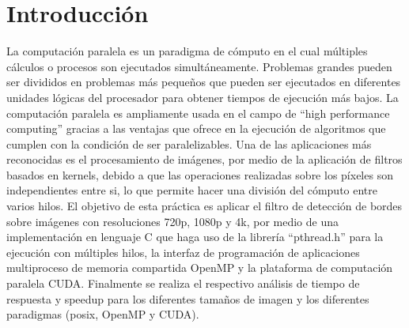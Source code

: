 





\maketitle



\section{Introducción}
La computación paralela es un paradigma de cómputo en el cual múltiples cálculos o procesos son ejecutados simultáneamente. Problemas grandes pueden ser divididos en problemas más pequeños que pueden ser ejecutados en diferentes unidades lógicas del procesador para obtener tiempos de ejecución más bajos. La computación paralela es ampliamente usada en el campo de ``high performance computing'' gracias a las ventajas que ofrece en la ejecución de algoritmos que cumplen con la condición de ser paralelizables. Una de las aplicaciones más reconocidas es el procesamiento de imágenes, por medio de la aplicación de filtros basados en kernels, debido a que las operaciones realizadas sobre los píxeles son independientes entre si, lo que permite hacer una división del cómputo entre varios hilos. El objetivo de esta práctica es aplicar el filtro de detección de bordes sobre imágenes con resoluciones 720p, 1080p y 4k, por medio de una implementación en lenguaje C que haga uso de la librería ``pthread.h'' para la ejecución con múltiples hilos, la interfaz de programación de aplicaciones multiproceso de memoria compartida OpenMP y la plataforma de computación paralela CUDA. Finalmente se realiza el respectivo análisis de tiempo de respuesta y speedup para los diferentes tamaños de imagen y los diferentes paradigmas (posix, OpenMP y CUDA).

